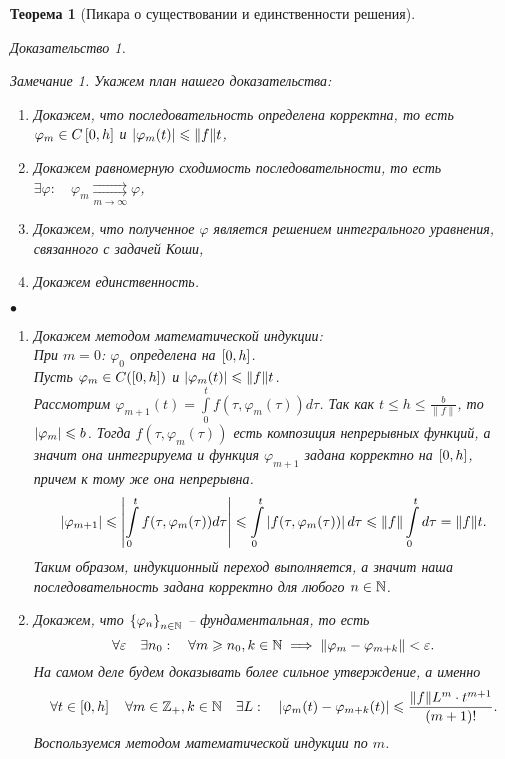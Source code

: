 \documentclass[a5paper, 10pt]{article}
\theoremstyle{definition}
\theoremstyle{plain}
\newtheorem{Th}{Теорема}
\theoremstyle{remark}
\newtheorem*{Note}{Замечание}
\newtheorem*{Proof}{Доказательство}
\begin{document}
\begin{Th}[Пикара о существовании и единственности решения]
\begin{Proof}
		\begin{Note}
			Укажем план нашего доказательства:
			\begin{enumerate}
				\item Докажем, что последовательность определена корректна, то есть $\varphi_m \in C\left[0,h\right]$ и $\left|\varphi_m(t)\right| \leqslant \|f\| t$,
				\item Докажем равномерную сходимость последовательности, то есть $\exists \varphi: \quad \varphi_m \underset{m\to\infty}{\rightrightarrows} \varphi$,
				\item Докажем, что полученное $\varphi$ является решением интегрального уравнения, связанного с задачей Коши,
				\item Докажем единственность.
			\end{enumerate}
		\end{Note}
		$\bullet$
		\begin{enumerate}
			\item Докажем методом математической индукции:\\
			При $m=0$: $\varphi_0$ определена на $\left[0,h\right]$.\\
			Пусть $\varphi_m \in C(\left[0,h\right])$ и $\left|\varphi_m(t)\right| \leqslant \|f\|t$.\\
			Рассмотрим $\varphi_{m+1}(t) = \int\limits_0^t f(\tau, \varphi_m(\tau))d\tau$. Так как $t\leqslant h \leqslant \frac{b}{\|f\|}$, то $\left|\varphi_m\right| \leqslant b$. Тогда $f(\tau, \varphi_m(\tau))$  есть композиция непрерывных функций, а значит она интегрируема и функция $\varphi_{m+1}$ задана корректно на $\left[0,h\right]$, причем к тому же она непрерывна. 
			\[
			\begin{split}
				\left|\varphi_{m+1}\right| \leqslant \left|\int\limits_0^t f(\tau, \varphi_m(\tau))d\tau\right| \leqslant \int\limits_0^t \left|f(\tau, \varphi_m(\tau))\right|d\tau \leqslant \|f\| \int\limits_0^td\tau = \|f\| t.
			\end{split}
			\]
			Таким образом, индукционный переход выполняется, а значит наша последовательность задана корректно для любого $n\in\mathbb{N}$.
			\item Докажем, что $\left\{\varphi_n\right\}_{n\in\mathbb{N}}$ -- фундаментальная, то есть 
			\[
			\forall \varepsilon \quad \exists n_0: \quad \forall m \geqslant n_0, k\in \mathbb{N} \implies \|\varphi_m - \varphi_{m+k}\| < \varepsilon.
			\]
			На самом деле будем доказывать более сильное утверждение, а именно
			\[
			\forall t\in\left[0,h\right] \quad \forall m\in \mathbb{Z}_+, k \in \mathbb{N} \quad \exists L: \quad \left|\varphi_m(t) - \varphi_{m+k}(t)\right|\leqslant \frac{\|f\| L^m \cdot t^{m+1}}{(m+1)!}.
			\]
			Воспользуемся методом математической индукции по $m$.\\

\end{enumerate}
\end{Proof}
\end{Th}
\end{document}
